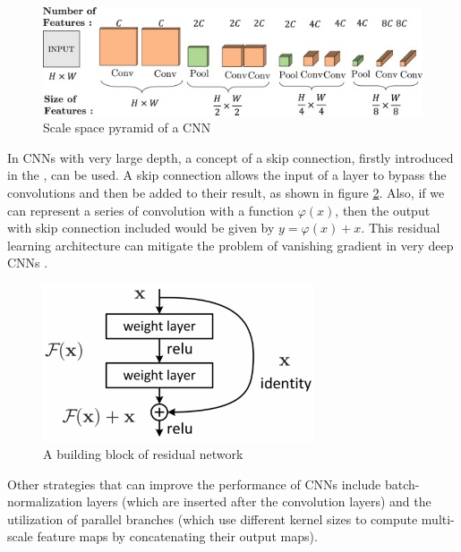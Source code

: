 \begin{figure}[H]
\begin{centering}
\includegraphics[width=12cm]{assets/images/cnn-layers.jpg}
\par\end{centering}
\caption{Scale space pyramid of a CNN \cite{Santosh2022-3}}
\label{fig:cnn-layers}
\end{figure}

In CNNs with very large depth, a concept of a skip connection, firstly introduced in the \cite{He2016}, can be used. A skip connection allows the input of a layer to bypass the convolutions and then be added to their result, as shown in figure \ref{fig:skip-conn}. Also, if we can represent a series of convolution with a function $\varphi(x)$, then the output with skip connection included would be given by $y=\varphi(x) + x$. This residual learning architecture can mitigate the problem of vanishing gradient in very deep CNNs \cite{Santosh2022-2}.

\begin{figure}[H]
\begin{centering}
\includegraphics[width=8cm]{assets/images/skip-conn.png}
\par\end{centering}
\caption{A building block of residual network \cite{He2016}}
\label{fig:skip-conn}
\end{figure}

Other strategies that can improve the performance of CNNs include batch-normalization layers \cite{Ioffe2015}(which are inserted after the convolution layers) and the utilization of parallel branches \cite{Szegedy2015} (which use different kernel sizes to compute multi-scale feature maps by concatenating their output maps).

